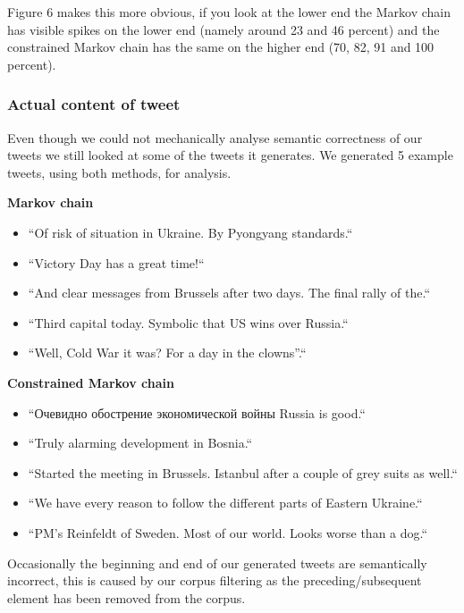 \documentclass[a4paper,12pt]{article}
\begin{document}
Figure 6 makes this more obvious, if you look at the lower end the Markov chain has visible spikes on the lower end (namely around 23 and 46 percent) and the constrained Markov chain has the same on the higher end (70, 82, 91 and 100 percent).

\subsubsection{Actual content of tweet}
Even though we could not mechanically analyse semantic correctness of our tweets we still looked at some of the tweets it generates. We generated 5 example tweets, using both methods, for analysis.

\textbf{Markov chain}

\begin{itemize}
\setlength\itemsep{-0.8em}
\item ``Of risk of situation in Ukraine. By Pyongyang standards.``
\item ``Victory Day has a great time!\hspace{0 cm}``
\item ``And clear messages from Brussels after two days. The final rally of the.``
\item ``Third capital today. Symbolic that US wins over Russia.``
\item ``Well, Cold War it was? For a day in the clowns''.``
\end{itemize}

\textbf{Constrained Markov chain}

\begin{itemize}
\setlength\itemsep{-0.8em}
\item ``Очевидно обострение экономической войны Russia is good.``
\item ``Truly alarming development in Bosnia.`` %
\item ``Started the meeting in Brussels. Istanbul after a couple of grey suits as well.``
\item ``We have every reason to follow the different parts of Eastern Ukraine.``
\item ``PM's Reinfeldt of Sweden. Most of our world. Looks worse than a dog.``
\end{itemize}

Occasionally the beginning and end of our generated tweets are semantically incorrect, this is caused by our corpus filtering as the preceding/subsequent element has been removed from the corpus.
\end{document}
